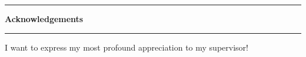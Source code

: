 \thispagestyle{empty}
\rule{\textwidth}{}
\begin{center}
\large
\textbf{Acknowledgements}\\
\vspace{0mm} %
\end{center}
\rule{\textwidth}{}
\vspace{1mm}

I want to express my most profound appreciation to my supervisor!